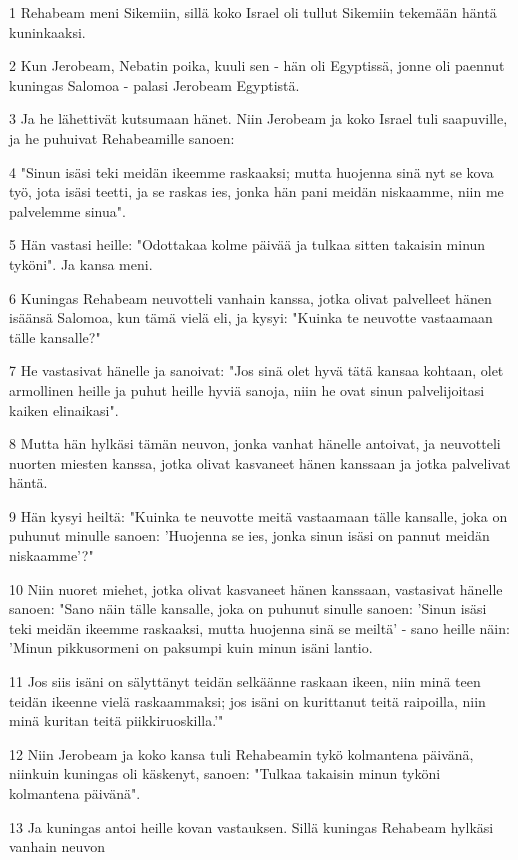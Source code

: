 \par 1 Rehabeam meni Sikemiin, sillä koko Israel oli tullut Sikemiin tekemään häntä kuninkaaksi.
\par 2 Kun Jerobeam, Nebatin poika, kuuli sen - hän oli Egyptissä, jonne oli paennut kuningas Salomoa - palasi Jerobeam Egyptistä.
\par 3 Ja he lähettivät kutsumaan hänet. Niin Jerobeam ja koko Israel tuli saapuville, ja he puhuivat Rehabeamille sanoen:
\par 4 "Sinun isäsi teki meidän ikeemme raskaaksi; mutta huojenna sinä nyt se kova työ, jota isäsi teetti, ja se raskas ies, jonka hän pani meidän niskaamme, niin me palvelemme sinua".
\par 5 Hän vastasi heille: "Odottakaa kolme päivää ja tulkaa sitten takaisin minun tyköni". Ja kansa meni.
\par 6 Kuningas Rehabeam neuvotteli vanhain kanssa, jotka olivat palvelleet hänen isäänsä Salomoa, kun tämä vielä eli, ja kysyi: "Kuinka te neuvotte vastaamaan tälle kansalle?"
\par 7 He vastasivat hänelle ja sanoivat: "Jos sinä olet hyvä tätä kansaa kohtaan, olet armollinen heille ja puhut heille hyviä sanoja, niin he ovat sinun palvelijoitasi kaiken elinaikasi".
\par 8 Mutta hän hylkäsi tämän neuvon, jonka vanhat hänelle antoivat, ja neuvotteli nuorten miesten kanssa, jotka olivat kasvaneet hänen kanssaan ja jotka palvelivat häntä.
\par 9 Hän kysyi heiltä: "Kuinka te neuvotte meitä vastaamaan tälle kansalle, joka on puhunut minulle sanoen: 'Huojenna se ies, jonka sinun isäsi on pannut meidän niskaamme'?"
\par 10 Niin nuoret miehet, jotka olivat kasvaneet hänen kanssaan, vastasivat hänelle sanoen: "Sano näin tälle kansalle, joka on puhunut sinulle sanoen: 'Sinun isäsi teki meidän ikeemme raskaaksi, mutta huojenna sinä se meiltä' - sano heille näin: 'Minun pikkusormeni on paksumpi kuin minun isäni lantio.
\par 11 Jos siis isäni on sälyttänyt teidän selkäänne raskaan ikeen, niin minä teen teidän ikeenne vielä raskaammaksi; jos isäni on kurittanut teitä raipoilla, niin minä kuritan teitä piikkiruoskilla.'"
\par 12 Niin Jerobeam ja koko kansa tuli Rehabeamin tykö kolmantena päivänä, niinkuin kuningas oli käskenyt, sanoen: "Tulkaa takaisin minun tyköni kolmantena päivänä".
\par 13 Ja kuningas antoi heille kovan vastauksen. Sillä kuningas Rehabeam hylkäsi vanhain neuvon
